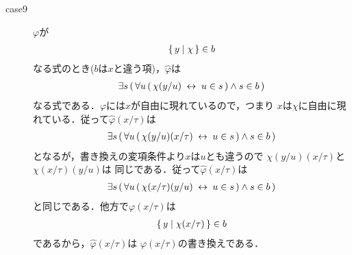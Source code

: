 \begin{metaprf}
\begin{description}
\begin{description}
					\item[case9] $\varphi$が
						\begin{align}
							\{\, y \mid \chi\, \} \in b
						\end{align}
						なる式のとき($b$は$x$と違う項)，$\widehat{\varphi}$は
						\begin{align}
							\exists s\, (\, \forall u\, (\, \chi(y/u) \hspace{0.25em}\leftrightarrow\hspace{0.25em} u \in s\, ) \wedge s \in b\, )
						\end{align}
						なる式である．$\varphi$には$x$が自由に現れているので，つまり
						$x$は$\chi$に自由に現れている．従って$\widehat{\varphi}(x/\tau)$は
						\begin{align}
							\exists s\, (\, \forall u\, (\, \chi(y/u)(x/\tau) \hspace{0.25em}\leftrightarrow\hspace{0.25em} u \in s\, ) \wedge s \in b\, )
						\end{align}
						となるが，書き換えの変項条件より$x$は$u$とも違うので
						$\chi(y/u)(x/\tau)$と$\chi(x/\tau)(y/u)$は
						同じである．従って$\widehat{\varphi}(x/\tau)$は
						\begin{align}
							\exists s\, (\, \forall u\, (\, \chi(x/\tau)(y/u) \hspace{0.25em}\leftrightarrow\hspace{0.25em} u \in s\, ) \wedge s \in b\, )
						\end{align}
						と同じである．他方で$\varphi(x/\tau)$は
						\begin{align}
							\{\, y \mid \chi(x/\tau)\, \} \in b
						\end{align}
						であるから，$\widehat{\varphi}(x/\tau)$は
						$\varphi(x/\tau)$の書き換えである．
						

\end{description}
\end{description}
\end{metaprf}
